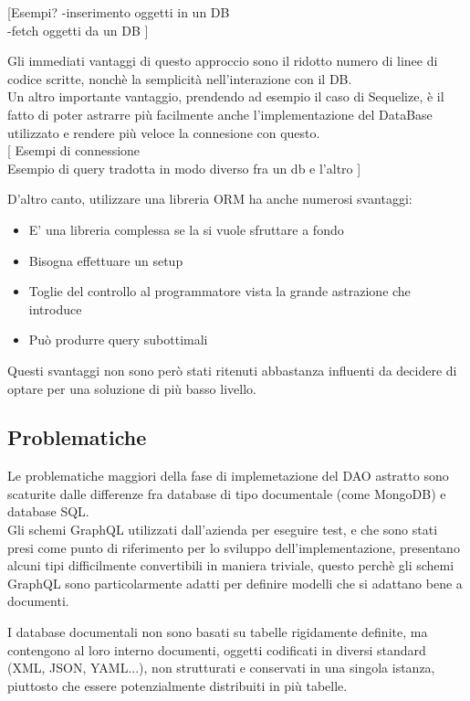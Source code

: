 \documentclass[a4paper, 12pt]{scrartcl}
\begin{document}
        [Esempi?
            -inserimento oggetti in un DB\\
            -fetch oggetti da un DB
        ]

        Gli immediati vantaggi di questo approccio sono il ridotto numero di linee di codice scritte, nonchè la semplicità nell'interazione con il DB.\\
        Un altro importante vantaggio, prendendo ad esempio il caso di Sequelize, è il fatto di poter astrarre più facilmente anche l'implementazione del DataBase utilizzato e rendere più veloce la connesione con questo.\\

        [
            Esempi di connessione\\
            Esempio di query tradotta in modo diverso fra un db e l'altro
        ]

        D'altro canto, utilizzare una libreria ORM ha anche numerosi svantaggi:
        \begin{itemize}
          \item E' una libreria complessa se la si vuole sfruttare a fondo
          \item Bisogna effettuare un setup
          \item Toglie del controllo al programmatore vista la grande astrazione che introduce
          \item Può produrre query subottimali
        \end{itemize}
        Questi svantaggi non sono però stati ritenuti abbastanza influenti da decidere di optare per una soluzione di più basso livello.\\
      \newpage
    \subsection*{Problematiche}
      Le problematiche maggiori della fase di implemetazione del DAO astratto sono scaturite dalle differenze fra database di tipo documentale (come MongoDB) e database SQL.\\
      Gli schemi GraphQL utilizzati dall'azienda per eseguire test, e che sono stati presi come punto di riferimento per lo sviluppo dell'implementazione, presentano alcuni tipi difficilmente convertibili in maniera triviale, questo perchè gli schemi GraphQL sono
      particolarmente adatti per definire modelli che si adattano bene a documenti.

      I database documentali non sono basati su tabelle rigidamente definite, ma contengono al loro interno documenti, oggetti codificati in diversi standard (XML, JSON, YAML...), non strutturati e conservati in una singola istanza, piuttosto che essere potenzialmente distribuiti in più tabelle.
      
\end{document}
